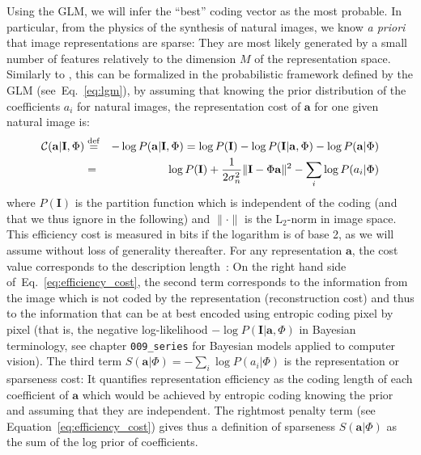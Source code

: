 \documentclass[a4paper, 11pt]{book}
\newcommand{\image}{\mathbf{I}} %
\newcommand{\dico}{\Phi} %
\newcommand{\coef}{\mathbf{a}} %
\newcommand{\eqdef}{\stackrel{\rm def}{=}}%
\newcommand{\seeEq}[1]{Eq.~\ref{eq:#1}}%
\begin{document}
Using the GLM, we will infer the ``best'' coding vector as the most probable. In particular, from the physics of the synthesis of natural images, we know \emph{a priori} that image representations are sparse: They are most likely generated by a small number of features relatively to the dimension $M$ of the representation space. %
Similarly to \citet{Lewicki00}, this can be formalized in the probabilistic framework defined by the GLM (see~\seeEq{lgm}), by assuming that knowing the prior distribution of the coefficients $a_i$ for natural images, the representation cost of $\coef$ for one given natural image is:%
\begin{eqnarray}%
\mathcal{C}( \coef | \image , \dico) 	&\eqdef& -\log P( \coef | \image , \dico) 
=  \log P( \image )  -\log P( \image | \coef , \dico) -  \log P(\coef | \dico) \nonumber \\
&=& \log P( \image ) + \frac{1}{2\sigma_n^2} \| \image - \dico \coef \|^2 - \sum_i \log P(a_i | \dico)%
\label{eq:efficiency_cost}%
\end{eqnarray}%
where $P( \image )$ is the partition function which is independent of the coding (and that we thus ignore in the following) and $ \| \cdot \|$ is the L$_2$-norm in image space. This efficiency cost is measured in bits if the logarithm is of base 2, as we will assume without loss of generality thereafter. For any representation $\coef$, the cost value corresponds to the description length~\citep{Rissanen78}: On the right hand side of~\seeEq{efficiency_cost}, the second term corresponds to the information from the image which is not coded by the representation (reconstruction cost) and thus to the information that can be at best encoded using entropic coding pixel by pixel (that is, the negative log-likelihood $-\log P( \image | \coef , \dico)$ in Bayesian terminology, see chapter \verb+009_series+ for Bayesian models applied to computer vision). The third term $S( \coef | \dico) = - \sum_i \log P(a_i | \dico)$ is the representation or sparseness cost: It quantifies representation efficiency as the coding length of each coefficient of $\coef$ which would be achieved by entropic coding knowing the prior and assuming that they are independent.
The rightmost penalty term (see Equation~\ref{eq:efficiency_cost}) gives thus a definition of sparseness $S( \coef | \dico)$ as the sum of the log prior of coefficients.
\end{document}
